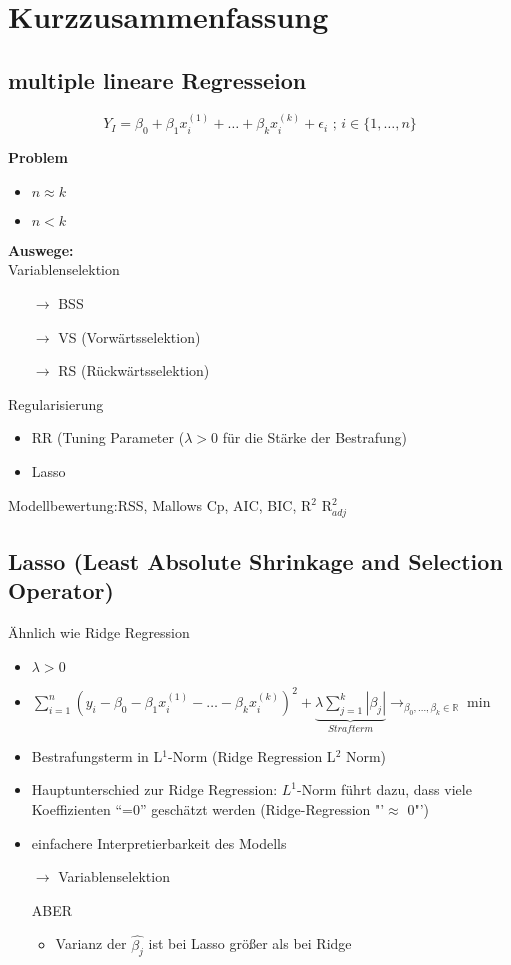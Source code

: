 \section{Kurzzusammenfassung}
\subsection{multiple lineare Regresseion}
\[Y_I = \beta_0 + \beta_1 x_i^{(1)} + \ldots + \beta_k x_i^{(k)} + \epsilon_i \text{ ; } i \in \{1, \ldots,n\}\]

\textbf{Problem}
\begin{itemize}
	\item \(n \approx k\)
	\item \(n < k\)
\end{itemize}
\textbf{Auswege:} \\
Variablenselektion
\begin{itemize}
	\item[\(\rightarrow\)] BSS
	\item[\(\rightarrow\)] VS (Vorwärtsselektion)
	\item[\(\rightarrow\)] RS (Rückwärtsselektion)
\end{itemize}
Regularisierung
\begin{itemize}
	\item RR (Tuning Parameter (\(\lambda > 0\) für die Stärke der Bestrafung)
	\item Lasso
\end{itemize}

Modellbewertung:RSS, Mallows Cp, AIC, BIC, R$^2$ R$_{adj}^2$

\subsection{Lasso (Least Absolute Shrinkage and Selection Operator)}
Ähnlich wie Ridge Regression 
\begin{itemize}
	\item \(\lambda > 0 \)
	\item \(\sum_{i = 1}^{n}(y_i -\beta_0 - \beta_1 x_i^{(1)} - \ldots - \beta_k x_i^{(k)})^2 + \underbrace{\lambda \sum_{j = 1}^{k}|\beta_j|}_{Strafterm}
	\rightarrow_{\beta_0, \ldots, \beta_k \in \mathbb{R}} \min \)
	\item Bestrafungsterm in L$^1$-Norm (Ridge Regression L$^2$ Norm)
	\item Hauptunterschied zur Ridge Regression: $L^1$-Norm führt dazu, dass viele Koeffizienten "`=0"' geschätzt werden (Ridge-Regression "'$\approx$ 0"')
	\item einfachere Interpretierbarkeit des Modells
	\item [\(\rightarrow\)] Variablenselektion
	\item [ABER]
	\begin{itemize}
		\item Varianz der $ \hat{\beta_j} $ ist bei Lasso größer als bei Ridge
	\end{itemize}
\end{itemize}

